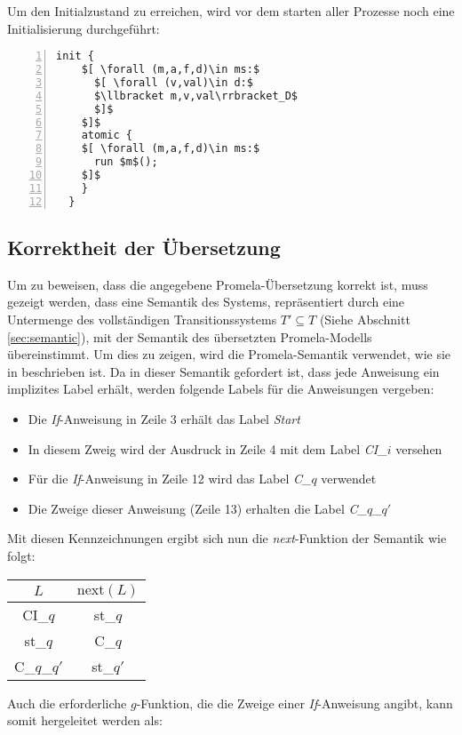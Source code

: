 Um den Initialzustand zu erreichen, wird vor dem starten aller Prozesse noch eine Initialisierung durchgeführt:
\begin{lstlisting}[language=Promela,mathescape=true,numbers=left,numberstyle=\small]
  init {
    $[ \forall (m,a,f,d)\in ms:$
      $[ \forall (v,val)\in d:$
      $\llbracket m,v,val\rrbracket_D$
      $]$
    $]$
    atomic {
    $[ \forall (m,a,f,d)\in ms:$
      run $m$();
    $]$
    }
  }
\end{lstlisting}

\subsection{Korrektheit der Übersetzung}
Um zu beweisen, dass die angegebene Promela-Übersetzung korrekt ist, muss gezeigt werden, dass eine Semantik des Systems, repräsentiert durch eine Untermenge des vollständigen Transitionssystems $T'\subseteq T$ (Siehe Abschnitt \ref{sec:semantic}), mit der Semantik des übersetzten Promela-Modells übereinstimmt.
Um dies zu zeigen, wird die Promela-Semantik verwendet, wie sie in \cite{Gallardo04formalaspects} beschrieben ist.
Da in dieser Semantik gefordert ist, dass jede Anweisung ein implizites Label erhält, werden folgende Labels für die Anweisungen vergeben:
\begin{itemize}
\item Die \emph{If}-Anweisung in Zeile 3 erhält das Label \emph{Start}
\item In diesem Zweig wird der Ausdruck in Zeile 4 mit dem Label \emph{CI\_$i$} versehen
\item Für die \emph{If}-Anweisung in Zeile 12 wird das Label \emph{C\_$q$} verwendet
\item Die Zweige dieser Anweisung (Zeile 13) erhalten die Label \emph{C\_$q$\_$q'$}
\end{itemize}

Mit diesen Kennzeichnungen ergibt sich nun die \emph{next}-Funktion der Semantik wie folgt:

\begin{tabular}{|c|c|}
  \hline
  $L$ & $\textrm{next}(L)$\\
  \hline
  CI\_$q$ & st\_$q$\\
  st\_$q$ & C\_$q$\\
  C\_$q$\_$q'$ & st\_$q'$\\
  \hline
\end{tabular}

Auch die erforderliche $g$-Funktion, die die Zweige einer \emph{If}-Anweisung angibt, kann somit hergeleitet werden als:


